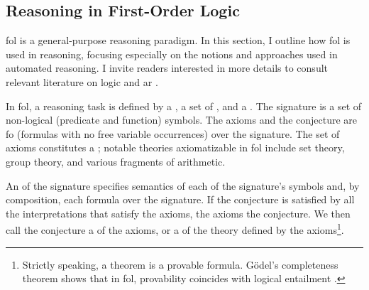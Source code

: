 \subsection{Reasoning in First-Order Logic}


\Gls{fol} is a general-purpose reasoning paradigm.
In this section, I outline how \gls{fol} is used in reasoning,
focusing especially on the notions and approaches used in automated reasoning.
I invite readers interested in more details to consult relevant literature on \gls{logic} \cite{DBLP:books/daglib/0072413,DBLP:books/daglib/0082098} and \gls{ar} \cite{DBLP:books/daglib/0022394,DBLP:books/el/RobinsonV01}.

In \gls{fol}, a reasoning task is defined by a , a set of , and a .
The signature is a set of non-logical (predicate and function) symbols.
The axioms and the conjecture are \gls{fo}  (formulas with no free variable occurrences) over the signature.
The set of axioms constitutes a ;
notable theories axiomatizable in \gls{fol} include set theory, group theory, and various fragments of arithmetic.

An  of the signature specifies semantics of each of the signature's symbols and, by composition, each formula over the signature.
If the conjecture is satisfied by all the interpretations that satisfy the axioms,
the axioms  the conjecture.
We then call the conjecture
a  of the axioms,
or a  of the theory defined by the axioms\footnote{Strictly speaking, a theorem is a provable formula.
Gödel's completeness theorem shows that in \gls{fol},
provability coincides with logical entailment \cite{DBLP:books/daglib/0072413}.}.


